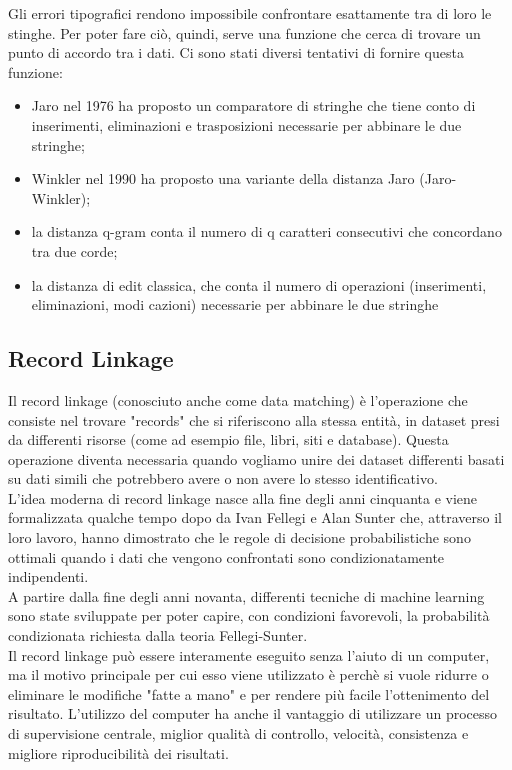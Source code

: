 \documentclass[a4paper,12pt]{article}
\begin{document}
Gli errori tipografici rendono impossibile confrontare esattamente tra di loro le stinghe.  Per poter fare ciò, quindi, serve una funzione che cerca di trovare un punto di accordo tra i dati. Ci sono stati diversi tentativi di fornire questa funzione:

\begin{itemize}
\item Jaro \cite{census/jaro76} nel 1976 ha proposto un comparatore di stringhe che tiene conto di inserimenti, eliminazioni e trasposizioni necessarie per abbinare le due stringhe;
\item Winkler \cite{winkler90} nel 1990 ha proposto una variante della distanza Jaro (Jaro-Winkler);
\item la distanza q-gram conta il numero di q caratteri consecutivi che concordano tra due corde;
\item la distanza di edit classica, che conta il numero di operazioni (inserimenti, eliminazioni, modi cazioni) necessarie per abbinare le due stringhe
\end{itemize}

\subsection{Record Linkage}

Il record linkage (conosciuto anche come data matching) è l'operazione che consiste nel trovare "records" che si riferiscono alla stessa entità, in dataset presi da differenti risorse (come ad esempio file, libri, siti e database).
Questa operazione diventa necessaria quando vogliamo unire dei dataset differenti basati su dati simili che potrebbero avere o non avere lo stesso identificativo. \\
L'idea moderna di record linkage nasce alla fine degli anni cinquanta e viene formalizzata qualche tempo dopo da Ivan Fellegi e Alan Sunter \cite{fellegi69} che, attraverso il loro lavoro, hanno dimostrato che le regole di decisione probabilistiche sono ottimali quando i dati che vengono confrontati sono condizionatamente indipendenti. \\
A partire dalla fine degli anni novanta, differenti tecniche di machine learning sono state sviluppate per poter capire, con condizioni favorevoli, la probabilità condizionata richiesta dalla teoria Fellegi-Sunter. \\
Il record linkage può essere interamente eseguito senza l'aiuto di un computer, ma il motivo principale per cui esso viene utilizzato è perchè si vuole ridurre o eliminare le modifiche "fatte a mano" e per rendere più facile l'ottenimento del risultato. 
L'utilizzo del computer ha anche il vantaggio di utilizzare un processo di supervisione centrale, miglior qualità di controllo, velocità, consistenza e migliore riproducibilità dei risultati. %
\end{document}
